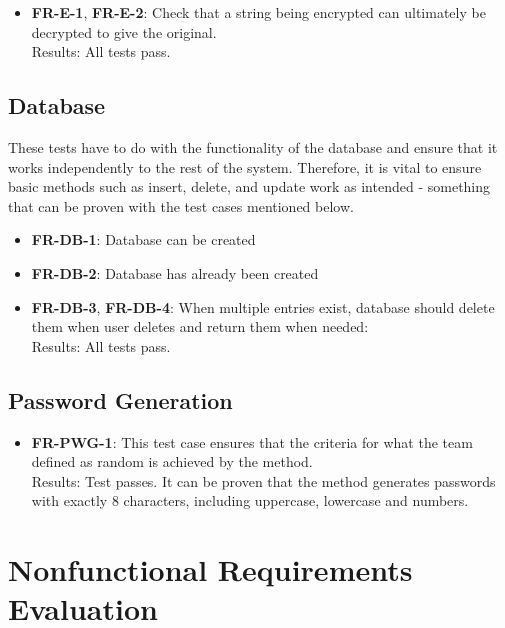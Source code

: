 \documentclass[12pt, titlepage]{article}
\begin{document}
		\begin{itemize}
			
			\item \textbf{FR-E-1}, \textbf{FR-E-2}: Check that a string being encrypted can ultimately be decrypted to give the original.\\
			Results: All tests pass.
		
		\end{itemize}	

	\subsection{Database}
		These tests have to do with the functionality of the database and ensure that it works independently to the rest of the system. Therefore, it is vital to ensure basic methods such as insert, delete, and update work as intended - something that can be proven with the test cases mentioned below.

		\begin{itemize}
			
			\item \textbf{FR-DB-1}: Database can be created
			\item \textbf{FR-DB-2}: Database has already been created
			\item \textbf{FR-DB-3}, \textbf{FR-DB-4}: When multiple entries exist, database should delete them when user deletes and return them when needed:\\
			Results: All tests pass. 

			
		\end{itemize}

	\subsection{Password Generation}

		\begin{itemize}

			\item \textbf{FR-PWG-1}: This test case ensures that the criteria for what the team defined as random is achieved by the method.\\
			Results: Test passes. It can be proven that the method generates passwords with exactly 8 characters, including uppercase, lowercase and numbers.

		\end{itemize}

\section{Nonfunctional Requirements Evaluation}
\end{document}
